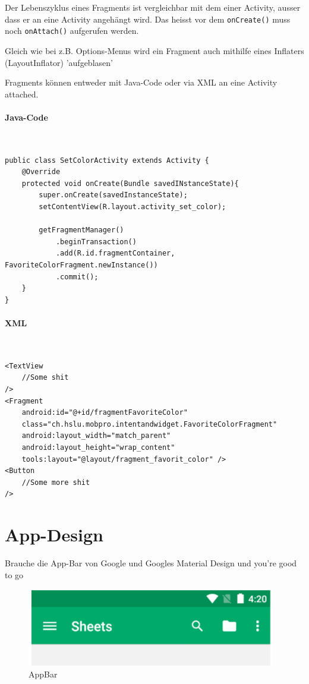 \documentclass[a4paper, 11pt]{article}
\newcommand{\code}[1]{\texttt{#1}}
\begin{document}
\noindent Der Lebenszyklus eines Fragments ist vergleichbar mit dem einer Activity, ausser dass er an eine Activity angehängt wird. Das heisst vor dem \code{onCreate()} muss noch \code{onAttach()} aufgerufen werden.

Gleich wie bei z.B. Options-Menus wird ein Fragment auch mithilfe eines Inflaters (LayoutInflator) 'aufgeblasen'

\vspace{10px}

\noindent Fragments können entweder mit Java-Code oder via XML an eine Activity attached.

\paragraph{Java-Code}\mbox{}\\
\begin{lstlisting}[caption={Attachen eines Fragments im Java-Code}]
public class SetColorActivity extends Activity {
	@Override
	protected void onCreate(Bundle savedINstanceState){
		super.onCreate(savedInstanceState);
		setContentView(R.layout.activity_set_color);
		
		getFragmentManager()
			.beginTransaction()
			.add(R.id.fragmentContainer, FavoriteColorFragment.newInstance())
			.commit();
	}
}
\end{lstlisting}

\paragraph{XML}\mbox{}\\
\begin{lstlisting}[caption={Attachen eines Fragments direkt im XML}]
<TextView
	//Some shit
/>
<Fragment
	android:id="@+id/fragmentFavoriteColor"
	class="ch.hslu.mobpro.intentandwidget.FavoriteColorFragment"
	android:layout_width="match_parent"
	android:layout_height="wrap_content"
	tools:layout="@layout/fragment_favorit_color" />
<Button
	//Some more shit
/>

\end{lstlisting}

\section{App-Design}
Brauche die App-Bar von Google und Googles Material Design und you're good to go

\begin{figure}[htb]
	\centering
	\includegraphics[keepaspectratio=true,height=5\baselineskip]{app_bar.PNG}
	\caption{AppBar}
	\label{fig:appbar}
\end{figure}
\end{document}
